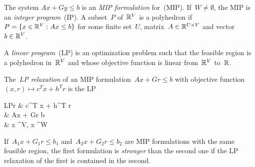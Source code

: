 \documentclass[../main.tex]{subfiles}
\begin{document}
The system ${Ax + Gy \leq b}$ is an \emph{MIP formulation} for~(MIP).
If~$W \neq \emptyset$, the MIP is an \emph{integer program}~(IP).
A subset~$P$ of~$\mathbb{R}^V$ is a polyhedron if~$P = \{x \in \mathbb{R}^V : Ax \leq b\}$ for some finite set~$U$, matrix~${A \in \mathbb{R}^{U \times V}}$ and vector ${b \in \mathbb{R}^V}$.

A \emph{linear program}~(LP) is an optimization problem such that the feasible region is a polyhedron in~$\mathbb{R}^V$ and whose objective function is linear from~$\mathbb{R}^V$ to~$\mathbb{R}$.

The~\emph{LP relaxation} of an MIP formulation~${Ax + Gr \leq b}$ with objective function~${(x, r) \mapsto c^T x + h^T r}$ is the LP
\begin{optimize}{LPr}
	 & c^T x + h^T r \\
	 & Ax + Gr \leq b \\
	& x \in \R^V, x \in \R^W
\end{optimize}

If~${A_1x + G_1r \leq b_1}$ and~${A_2x + G_2r \leq b_2}$ are MIP formulations with the same feasible region, the first formulation is \emph{stronger} than the second one if the LP relaxation of the first is contained in the second.
\end{document}
